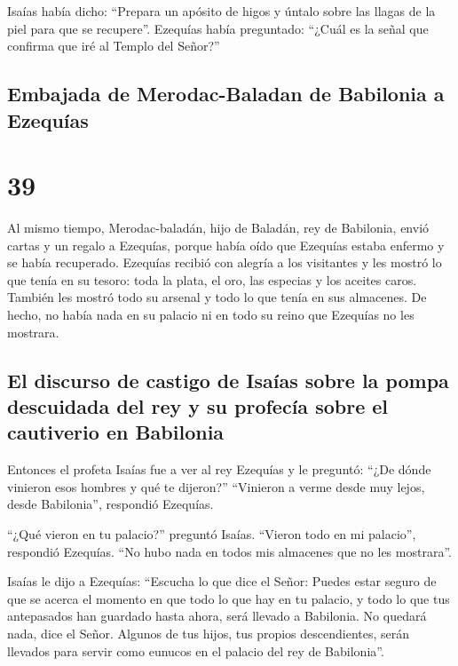  Isaías había dicho: ``Prepara un apósito de higos y
úntalo sobre las llagas de la piel para que se recupere''.
 Ezequías había preguntado: ``¿Cuál es la señal que
confirma que iré al Templo del Señor?''

\hypertarget{embajada-de-merodac-baladan-de-babilonia-a-ezequuxedas}{%
\subsection{Embajada de Merodac-Baladan de Babilonia a
Ezequías}\label{embajada-de-merodac-baladan-de-babilonia-a-ezequuxedas}}

\hypertarget{section-38}{%
\section{39}\label{section-38}}

 Al mismo tiempo, Merodac-baladán, hijo de Baladán, rey de
Babilonia, envió cartas y un regalo a Ezequías, porque había oído que
Ezequías estaba enfermo y se había recuperado.  Ezequías
recibió con alegría a los visitantes y les mostró lo que tenía en su
tesoro: toda la plata, el oro, las especias y los aceites caros. También
les mostró todo su arsenal y todo lo que tenía en sus almacenes. De
hecho, no había nada en su palacio ni en todo su reino que Ezequías no
les mostrara.

\hypertarget{el-discurso-de-castigo-de-isauxedas-sobre-la-pompa-descuidada-del-rey-y-su-profecuxeda-sobre-el-cautiverio-en-babilonia}{%
\subsection{El discurso de castigo de Isaías sobre la pompa descuidada
del rey y su profecía sobre el cautiverio en
Babilonia}\label{el-discurso-de-castigo-de-isauxedas-sobre-la-pompa-descuidada-del-rey-y-su-profecuxeda-sobre-el-cautiverio-en-babilonia}}

 Entonces el profeta Isaías fue a ver al rey Ezequías y le
preguntó: ``¿De dónde vinieron esos hombres y qué te dijeron?''
``Vinieron a verme desde muy lejos, desde Babilonia'', respondió
Ezequías.

 ``¿Qué vieron en tu palacio?'' preguntó Isaías. ``Vieron
todo en mi palacio'', respondió Ezequías. ``No hubo nada en todos mis
almacenes que no les mostrara''.

 Isaías le dijo a Ezequías: ``Escucha lo que dice el
Señor:  Puedes estar seguro de que se acerca el momento en
que todo lo que hay en tu palacio, y todo lo que tus antepasados han
guardado hasta ahora, será llevado a Babilonia. No quedará nada, dice el
Señor.  Algunos de tus hijos, tus propios descendientes,
serán llevados para servir como eunucos en el palacio del rey de
Babilonia''.

